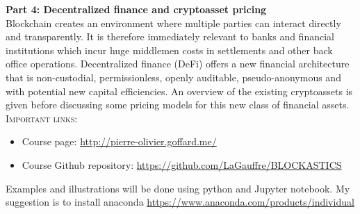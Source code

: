 \documentclass[11pt]{article}
\def\courseWebpage{\href{http://pierre-olivier.goffard.me/}{http://pierre-olivier.goffard.me/}}
\def\courseGithubRepo{\href{https://github.com/LaGauffre/BLOCKASTICS}{https://github.com/LaGauffre/BLOCKASTICS}}
\begin{document}
\noindent \textbf{Part 4: Decentralized finance and cryptoasset pricing}\\
\noindent Blockchain creates an environment where multiple parties can interact directly and transparently. It is therefore immediately relevant to banks and financial institutions which incur huge middlemen costs in settlements and other back office operations. Decentralized finance (DeFi) offers a new financial architecture that is non-custodial, permissionless, openly auditable, pseudo-anonymous and with potential new capital efficiencies. An overview of the existing cryptoassets is given before discussing some pricing models for this new class of financial assets. \\


\textsc{Important links:}
\begin{itemize}  
\item Course page: \courseWebpage  
\item Course Github repository: \courseGithubRepo
\end{itemize}
\noindent Examples and illustrations will be done using python and Jupyter notebook. My suggestion is to install anaconda \url{https://www.anaconda.com/products/individual} 





\end{document}
